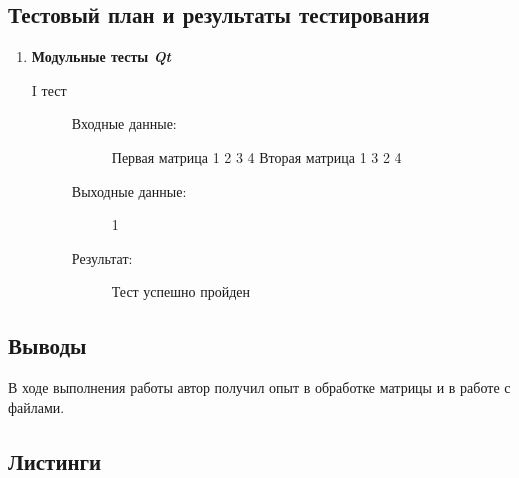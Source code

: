 \documentclass[12pt,a4paper]{report}
\begin{document}
\subsection{Тестовый план и результаты тестирования}
\hspace{\parindent}
\begin{enumerate}
\item \textbf{Модульные тесты \textit{Qt}}

\begin{description}
\item[I тест]
\hspace{\parindent}
\begin{flushleft}
\begin{description}
\item[Входные данные:]

\hspace{\parindent}
\begin{flushleft}
Первая матрица
1 2
3 4
Вторая матрица
1 3
2 4
\end{flushleft}

\item[Выходные данные:] 1
\item[Результат:] Тест успешно пройден
\end{description}
\end{flushleft}
\end{description}
\end{enumerate}

\subsection{Выводы}
\hspace{\parindent}
В ходе выполнения работы автор получил опыт в обработке матрицы и в работе с файлами.
\subsection*{Листинги}
\begin{itemize}

\end{itemize}

%
\end{document}
